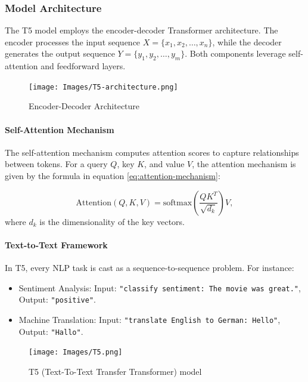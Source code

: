 \documentclass{dhbenelux}
\begin{document}
\subsubsection{Model Architecture}
The T5 model employs the encoder-decoder Transformer architecture. The encoder processes the input sequence $X = \{x_1, x_2, \dots, x_n\}$, while the decoder generates the output sequence $Y = \{y_1, y_2, \dots, y_m\}$. Both components leverage self-attention and feedforward layers.

\begin{figure}[h]
\caption{Encoder-Decoder Architecture}
\centering
\texttt{[image: Images/T5-architecture.png]}
\label{fig:encoder-decoder-architecture}
\end{figure}

\paragraph{Self-Attention Mechanism}
The self-attention mechanism computes attention scores to capture relationships between tokens. For a query \(Q\), key \(K\), and value \(V\), the attention mechanism is given by the formula in equation \ref{eq:attention-mechanism}:

\begin{equation}
\text{Attention}(Q, K, V) = \text{softmax}\left(\frac{QK^T}{\sqrt{d_k}}\right)V,
\label{eq:attention-mechanism}
\end{equation}
where \(d_k\) is the dimensionality of the key vectors.


\paragraph{Text-to-Text Framework}
In T5, every NLP task is cast as a sequence-to-sequence problem. For instance:
\begin{itemize}
    \item Sentiment Analysis: Input: \texttt{"classify sentiment: The movie was great."}, Output: \texttt{"positive"}.
    \item Machine Translation: Input: \texttt{"translate English to German: Hello"}, Output: \texttt{"Hallo"}.
\end{itemize}

\begin{figure}[h]
\caption{ T5 (Text-To-Text Transfer Transformer) model}
\centering
\texttt{[image: Images/T5.png]}
\label{fig:t5-model}
\end{figure}
\end{document}

